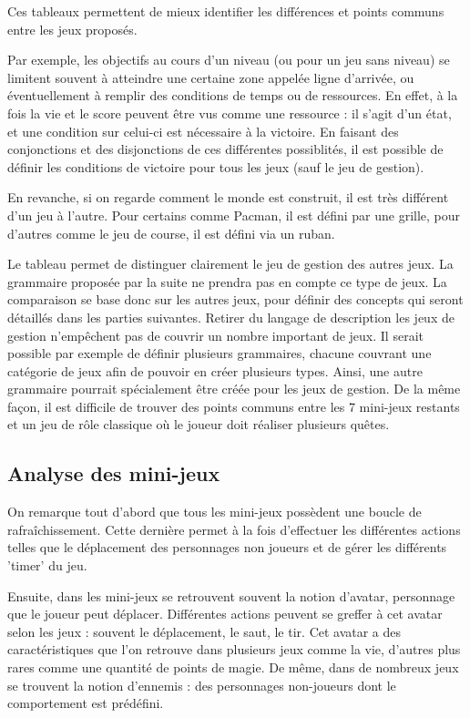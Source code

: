 \vspace{0.5cm}

Ces tableaux permettent de mieux identifier les différences et points communs entre les jeux proposés.

Par exemple, les objectifs au cours d'un niveau (ou pour un jeu sans niveau) se limitent souvent à atteindre une certaine zone
appelée ligne d'arrivée, ou éventuellement à remplir des conditions de temps ou de ressources. En effet, à la fois la vie et le score
peuvent être vus comme une ressource : il s'agit d'un état, et une condition sur celui-ci est nécessaire à la victoire.
En faisant des conjonctions et des disjonctions de ces différentes possiblités, il est possible de définir 
les conditions de victoire pour tous les jeux (sauf le jeu de gestion).

En revanche, si on regarde comment le monde est construit, il est très différent d'un jeu à l'autre.
Pour certains comme Pacman, il est défini par une grille, pour d'autres comme le jeu de course, il est défini via un ruban.

Le tableau permet de distinguer clairement le jeu de gestion des autres jeux.
La grammaire proposée par la suite ne prendra pas en compte ce type de jeux.
La comparaison se base donc sur les autres jeux, pour définir des concepts qui seront détaillés dans les parties suivantes.
Retirer du langage de description les jeux de gestion n'empêchent pas de couvrir un nombre important de jeux.
Il serait possible par exemple de définir plusieurs grammaires, chacune couvrant une catégorie de jeux afin de pouvoir en 
créer plusieurs types. Ainsi, une autre grammaire pourrait spécialement être créée pour les jeux de gestion.
De la même façon, il est difficile de trouver des points communs entre les 7 mini-jeux restants et un jeu de rôle classique où le joueur
doit réaliser plusieurs quêtes.

\subsection{Analyse des mini-jeux}

On remarque tout d'abord que tous les mini-jeux possèdent une boucle de rafraîchissement.
Cette dernière permet à la fois d'effectuer les différentes actions telles que le déplacement des personnages non joueurs et de gérer 
les différents 'timer' du jeu.

Ensuite, dans les mini-jeux se retrouvent souvent la notion d'avatar, personnage que le joueur peut déplacer.
Différentes actions peuvent se greffer à cet avatar selon les jeux : souvent le déplacement, le saut, le tir.
Cet avatar a des caractéristiques que l'on retrouve dans plusieurs jeux comme la vie, d'autres plus rares comme une quantité de points de magie.
De même, dans de nombreux jeux se trouvent la notion d'ennemis : des personnages non-joueurs dont le comportement est prédéfini.

